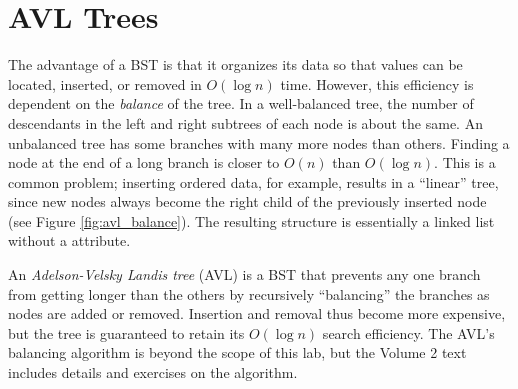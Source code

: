 \section*{AVL Trees} %

The advantage of a BST is that it organizes its data so that values can be located, inserted, or removed in $O(\log{n})$ time.
However, this efficiency is dependent on the \emph{balance} of the tree.
In a well-balanced tree, the number of descendants in the left and right subtrees of each node is about the same.
An unbalanced tree has some branches with many more nodes than others.
Finding a node at the end of a long branch is closer to $O(n)$ than $O(\log{n})$.
This is a common problem; inserting ordered data, for example, results in a ``linear'' tree, since new nodes always become the right child of the previously inserted node (see Figure \ref{fig:avl_balance}).
The resulting structure is essentially a linked list without a  attribute.

\begin{comment}
\begin{lstlisting}
# Sequentially adding ordered data destroys the efficiency of a BST.
>>> unbalanced_tree = BST()
>>> for i in range(10):
...     unbalanced_tree.insert(i)
...
# The tree is perfectly flat, so it loses its search efficiency.
>>> print(unbalanced_tree)
[0]
[1]
[2]
[3]
[4]
[5]
[6]
[7]
[8]
[9]

>>> balanced_tree = AVL()
>>> for i in range(10):
...     balanced_tree.insert(i)
...
# The AVL tree is balanced, so it retains its search efficiency.
>>> print(balanced_tree)
[3]
[1, 7]
[0, 2, 5, 8]
[4, 6, 9]
\end{lstlisting}
\end{comment}

An \emph{Adelson-Velsky Landis tree} (AVL) is a BST that prevents any one branch from getting longer than the others by recursively ``balancing'' the branches as nodes are added or removed.
Insertion and removal thus become more expensive, but the tree is guaranteed to retain its $O(\log{n})$ search efficiency.
The AVL's balancing algorithm is beyond the scope of this lab, but the Volume 2 text includes details and exercises on the algorithm.

